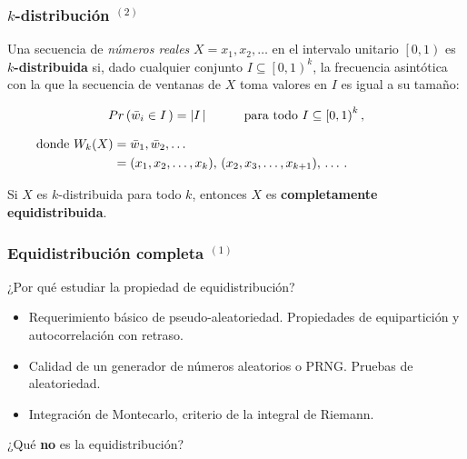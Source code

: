 \documentclass[t, 10pt, mathserif]{beamer}
\begin{document}

\begin{frame}
  \frametitle{$k$-distribución {$^{(2)}$}}

  Una secuencia de \textit{números reales} $X = x_1, x_2, \dots$ en el intervalo unitario $\left[0, 1\right)$ es \textbf{$k$-distribuida} si, dado cualquier conjunto $I \subseteq \left[0, 1\right)^k$, la frecuencia asintótica con la que la secuencia de ventanas de $X$ toma valores en $I$ es igual a su tamaño:
  \pause

  \begin{equation*}
    \begin{aligned}
      Pr \left( \bar{w}_i \in I\, \right) = \left| I\, \right| \hspace*{1cm} \text{para todo } I \subseteq \left[0, 1\right)^k \text{,}
    \end{aligned}
  \end{equation*}
  \pause

  \vspace{-0.5cm}
  \begin{equation*}
    \hspace{-2.5cm}
    \begin{aligned}
        \text{donde } W_k(X) =\; & \bar{w}_1, \bar{w}_2, \dots \\
                              =\; & (x_1, x_2, \dots, x_k      ),\, (x_2, x_3, \dots, x_{k + 1}),\, \dots \, \text{.}
    \end{aligned}
  \end{equation*}
  \vspace{-0.3cm}
  \pause

  Si $X$ es $k$-distribuida para todo $k$, entonces $X$ es \textbf{completamente equidistribuida}.
\end{frame}


\begin{frame}
  \frametitle{Equidistribución completa {$^{(1)}$}}

  ¿Por qué estudiar la propiedad de equidistribución?

  \begin{itemize}
    \item Requerimiento básico de pseudo-aleatoriedad. Propiedades de equipartición y autocorrelación con retraso. \pause
    \item Calidad de un generador de números aleatorios o PRNG. Pruebas de aleatoriedad.\pause %
    \item Integración de Montecarlo, criterio de la integral de Riemann.
  \end{itemize}
  \pause

  ¿Qué \textbf{no} es la equidistribución?
\end{frame}
 
\end{document}
